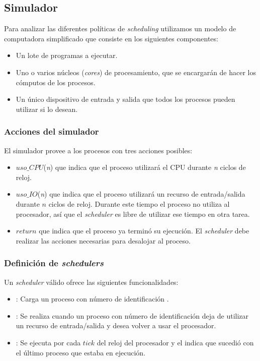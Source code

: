 \subsection{Simulador}

Para analizar las diferentes pol\'iticas de \emph{scheduling} utilizamos un modelo de computadora simplificado que consiste en los siguientes componentes:

\begin{itemize}
	\item Un lote de programas a ejecutar.
	\item Uno o varios n\'ucleos (\emph{cores}) de procesamiento, que se encargar\'an de hacer los c\'omputos de los procesos.
	\item Un \'unico dispositivo de entrada y salida que todos los procesos pueden utilizar si lo desean.
\end{itemize}

\subsubsection{Acciones del simulador}

El simulador provee a los procesos con tres acciones posibles:

\begin{itemize}
	\item $uso\_CPU$(\emph{n}) que indica que el proceso utilizar\'a el CPU durante \emph{n} ciclos de reloj.
	\item $uso\_IO$(\emph{n}) que indica que el proceso utilizar\'a un recurso de entrada/salida durante $n$ ciclos de reloj. Durante este tiempo el proceso no utiliza al procesador, as\'i que el \emph{scheduler} es libre de utilizar ese tiempo en otra tarea.
	\item $return$ que indica que el proceso ya termin\'o su ejecuci\'on. El \emph{scheduler} debe realizar las acciones necesarias para desalojar al proceso.
\end{itemize}

\subsubsection{Definici\'on de \emph{schedulers}}

Un \emph{scheduler} v\'alido ofrece las siguientes funcionalidades:
\begin{itemize}
	\item {}: Carga un proceso con n\'umero de identificaci\'on . 
	\item {}: Se realiza cuando un proceso con n\'umero de identificaci\'on  deja de utilizar un recurso de entrada/salida y desea volver a usar el procesador.
	\item {}: Se ejecuta por cada $tick$ del reloj del procesador  y el  indica que sucedi\'o con el \'ultimo proceso que estaba en ejecuci\'on.
\end{itemize}
